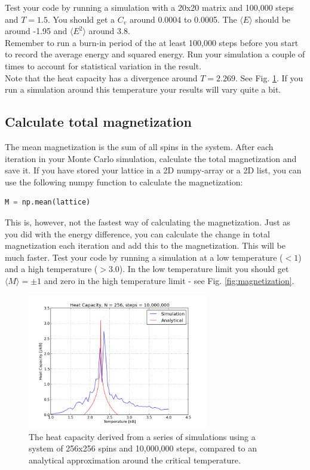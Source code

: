 \documentclass{article}
\begin{document}
Test your code by running a simulation with a 20x20 matrix
and 100,000 steps and $T = 1.5$.
You should get a $C_v$ around
0.0004 to 0.0005.
The $\langle E \rangle$ should be around -1.95 and $\langle E^2 \rangle$ around 3.8.\\

Remember to run a burn-in period of the at
least 100,000 steps before you start to record the
average energy and squared energy.
Run your simulation a couple of times to account
for statistical variation in the result.\\

Note that the heat capacity has a divergence around
$T = 2.269$. See Fig. \ref{fig:heat}.
If you run a simulation around this temperature your results will vary quite a bit.


\subsection{Calculate total magnetization}

The mean magnetization is the sum of all spins in the system.
After each iteration in your Monte Carlo simulation,
calculate the total magnetization and save it.
If you have stored your lattice in a 2D numpy-array or a 2D list,
you can use the following numpy function to calculate the magnetization:
\begin{lstlisting}[language=python]
M = np.mean(lattice)
\end{lstlisting}

This is, however, not the fastest way of calculating the magnetization.
Just as you did with the energy difference,
you can calculate the change in total magnetization each iteration and
add this to the magnetization. This will be much faster.
Test your code by running a simulation at a low temperature ($< 1$) and a
high temperature ($> 3.0$). In the low temperature limit
you should get $\langle M \rangle = \pm 1$ and zero in the high
temperature limit - see Fig. \ref{fig:magnetization}.


\begin{figure}[p]
  \centering
  \includegraphics[width=0.7\textwidth]{cv_anal.png}
  \caption{The heat capacity derived from a series of simulations using a
  system of 256x256 spins and 10,000,000 steps,
  compared to an analytical approximation around the critical temperature.}
  \label{fig:heat}
\end{figure}
\end{document}
